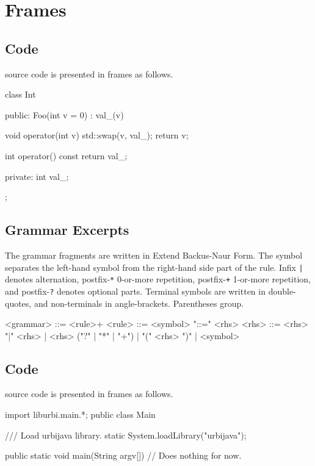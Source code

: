\section{Frames}

\subsection{\Cxx Code}
\label{sec:notations:cxx}

\Cxx source code is presented in frames as follows.

\begin{cxx}
class Int
{
public:
  Foo(int v = 0)
    : val_(v)
  {}

  void operator(int v)
  {
    std::swap(v, val_);
    return v;
  }

  int operator() const
  {
    return val_;
  }

private:
  int val_;
};
\end{cxx}

\subsection{Grammar Excerpts}
\label{sec:notations:bnf}

The grammar fragments are written in Extend Backus-Naur Form.  The symbol
\lstindex{::=} separates the left-hand symbol from the right-hand side part
of the rule.  Infix \lstinline{|} denotes alternation, postfix-\lstinline{*}
0-or-more repetition, postfix-\lstinline{+} 1-or-more repetition, and
postfix-\lstinline{?} denotes optional parts.  Terminal symbols are written
in double-quotes, and non-terminals in angle-brackets.  Parentheses group.

\begin{bnf}
<grammar> ::= <rule>+
<rule> ::= <symbol> "::=" <rhs>
<rhs> ::= <rhs> "|" <rhs>
        | <rhs> ("?" | "*" | "+")
        | "(" <rhs> ")"
        | <symbol>
\end{bnf}

\subsection{\Java Code}
\label{sec:notations:java}

\Java source code is presented in frames as follows.

\begin{java}
import liburbi.main.*;
public class Main
{
    /// Load urbijava library.
    static
    {
        System.loadLibrary("urbijava");
    }

    public static void main(String argv[])
    {
      // Does nothing for now.
    }
}
\end{java}


